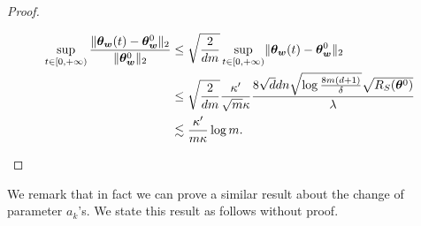 \documentclass{article}
\begin{document}
\begin{proof}
\begin{enumerate}[(a)]
\begin{equation*}
\begin{aligned}
                      \sup\limits_{t\in[0,+\infty)}\frac{\lVert\bm{\theta}_{\bm{w}}(t)-\bm{\theta}_{\bm{w}}^0\rVert_2}{\lVert\bm{\theta}_{\bm{w}}^0\rVert_2}
                       & \leq \sqrt{\frac{2}{dm}}\sup\limits_{t\in[0,+\infty)}\lVert\bm{\theta}_{\bm{w}}(t)-\bm{\theta}_{\bm{w}}^0\rVert_2                                           \\
                       & \leq  \sqrt{\frac{2}{dm}}\frac{\kappa'}{\sqrt{m}\kappa}\frac{8\sqrt{d}dn\sqrt{\log\frac{8m(d+1)}{\delta}}\sqrt{R_S(\bm{\theta}^0)}}{\lambda} \\
                       & \lesssim \frac{\kappa'}{m\kappa}\log m.
                  \end{aligned}
              \end{equation*}
    \end{enumerate}
\end{proof}
We remark that in fact we can prove a similar result about the change of parameter $a_k$'s. We state this result as follows without proof.
\end{document}

